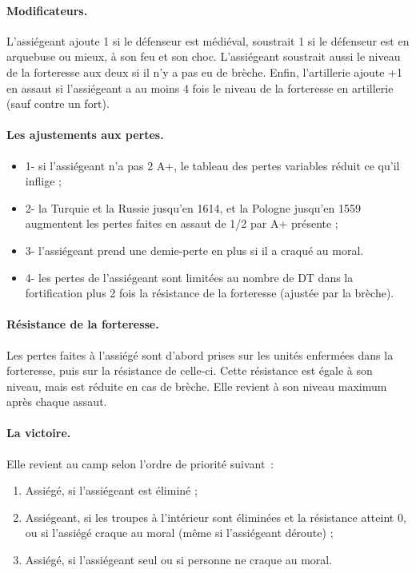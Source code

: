 \paragraph{Modificateurs.}
L'assiégeant ajoute 1 si le défenseur est médiéval, soustrait 1 si le défenseur est en arquebuse
ou mieux, à son feu et son choc.
L'assiégeant soustrait aussi le niveau de la forteresse aux deux si il n'y a pas eu de
brèche. Enfin, l'artillerie ajoute  +1 en assaut si l'assiégeant a au moins
4 fois le niveau de la forteresse en artillerie (sauf contre un fort).

\paragraph{Les ajustements aux pertes.}
\begin{itemize}
\item 1- si l'assiégeant n'a pas 2 A+, le tableau des pertes variables réduit
ce qu'il inflige ;
\item 2- la Turquie et la Russie jusqu'en 1614, et la Pologne jusqu'en 1559 augmentent
les pertes faites en assaut de 1/2 par A+ présente ;
\item 3- l'assiégeant prend une demie-perte en plus si il a craqué au moral.
\item 4- les pertes de l'assiégeant sont limitées au nombre de DT dans la
fortification plus 2 fois la résistance de
la forteresse (ajustée par la brèche).
\end{itemize}

\paragraph{Résistance de la forteresse.}
Les pertes faites à l'assiégé sont d'abord prises sur les unités enfermées dans
la forteresse, puis sur la résistance de celle-ci. Cette résistance est égale à
son niveau, mais est réduite en cas de brèche. Elle revient à son niveau
maximum après chaque assaut.

\paragraph{La victoire.} Elle revient au camp selon l'ordre de priorité suivant~:
\begin{enumerate}
\item Assiégé, si l'assiégeant est éliminé ;
\item Assiégeant, si les troupes à l'intérieur sont éliminées et la résistance atteint 0,
ou si l'assiégé craque au moral
(même si l'assiégeant déroute) ;
\item Assiégé, si l'assiégeant seul ou si personne ne craque au moral.
\end{enumerate}


